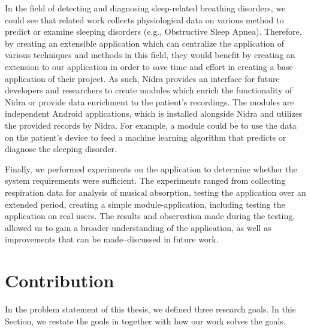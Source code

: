 In the field of detecting and diagnosing sleep-related breathing disorders, we could see that related work collects physiological data on various method to predict or examine sleeping disorders (e.g., Obstructive Sleep Apnea). Therefore, by creating an extensible application which can centralize the application of various techniques and methods in this field, they would benefit by creating an extension to our application in order to save time and effort in creating a base application of their project. As such, Nidra provides an interface for future developers and researchers to create modules which enrich the functionality of Nidra or provide data enrichment to the patient's recordings. The modules are independent Android applications, which is installed alongside Nidra and utilizes the provided records by Nidra.  For example, a module could be to use the data on the patient's device to feed a machine learning algorithm that predicts or diagnose the sleeping disorder.  

Finally, we performed experiments on the application to determine whether the system requirements were sufficient. The experiments ranged from collecting respiration data for analysis of musical absorption, testing the application over an extended period, creating a simple module-application, including testing the application on real users. The results and observation made during the testing, allowed us to gain a broader understanding of the application, as well as improvements that can be made--discussed in future work. 

\section{Contribution}
In the problem statement of this thesis, we defined three research goals. In this Section, we restate the goals in together with how our work solves the goals. 

